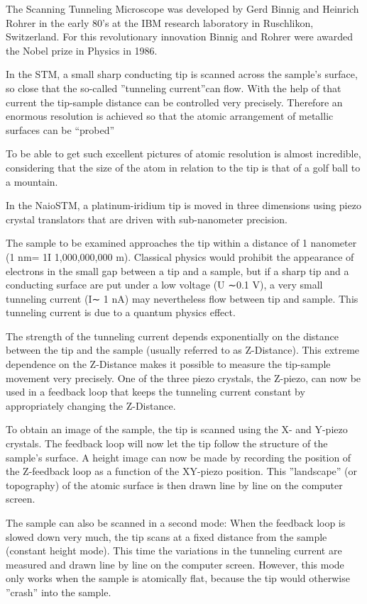 \documentclass[a4paper, 10pt, nanum]{CSUniSchoolLabReport}
\begin{document}
	The Scanning Tunneling Microscope was developed by Gerd Binnig and Heinrich Rohrer in the early 80’s at the IBM research laboratory in Ruschlikon, Switzerland. For this revolutionary innovation Binnig and Rohrer were awarded the Nobel prize in Physics in 1986.

	In the STM, a small sharp conducting tip is scanned across the sample’s surface, so close that the so-called ”tunneling current”can flow. With the help of that current the tip-sample distance can be controlled very precisely. Therefore an enormous resolution is achieved so that the atomic arrangement of metallic surfaces can be “probed”

	To be able to get such excellent pictures of atomic resolution is almost incredible, considering that the size of the atom in relation to the tip is that of a golf ball to a mountain.
	
	In the NaioSTM, a platinum-iridium tip is moved in three dimensions using piezo crystal translators that are driven with sub-nanometer precision.

	The sample to be examined approaches the tip within a distance of 1 nanometer (1 nm= 1I 1,000,000,000 m). Classical physics would prohibit the appearance of electrons in the small gap between a tip and a sample, but if a sharp tip and a conducting surface are put under a low voltage (U ∼0.1 V), a very small tunneling current (I∼ 1 nA) may nevertheless flow between tip and sample. This tunneling current is due to a quantum physics effect.

	The strength of the tunneling current depends exponentially on the distance between the tip and the sample (usually referred to as Z-Distance). This extreme dependence on the Z-Distance makes it possible to measure the tip-sample movement very precisely. One of the three piezo crystals, the Z-piezo, can now be used in a feedback loop that keeps the tunneling current constant by appropriately changing the Z-Distance.

	To obtain an image of the sample, the tip is scanned using the X- and Y-piezo crystals. The feedback loop will now let the tip follow the structure of the sample's surface. A height image can now be made by recording the position of the Z-feedback loop as a function of the XY-piezo position. This ”landscape” (or topography) of the atomic surface is then drawn line by line on the computer screen.

	The sample can also be scanned in a second mode: When the feedback loop is slowed down very much, the tip scans at a fixed distance from the sample (constant height mode). This time the variations in the tunneling current are measured and drawn line by line on the computer screen. However, this mode only works when the sample is atomically flat, because the tip would otherwise ”crash” into the sample. 
\end{document}

